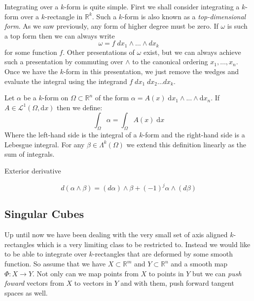 Integrating over a $k$-form is quite simple.
First we shall consider integrating a $k$-form over a $k$-rectangle in $\mathbb{R}^k$.
Such a $k$-form is also known as a \emph{top-dimensional form}.
As we saw previously, any form of higher degree must be zero.
If $\omega$ is such a top form then we can always write
\begin{equation}
	\omega = f \; dx_1 \wedge \ldots \wedge dx_k
\end{equation}
for some function $f$.
Other presentations of $\omega$ exist, but we can always achieve such a presentation by commuting over $\wedge$ 
to the canonical ordering $x_1, \ldots, x_n$.
Once we have the $k$-form in this presentation, we just remove the wedges and evaluate the integral using the
integrand $f \; dx_1 \;dx_2 \ldots dx_k$.

\begin{definition}
Let $\alpha$ be a $k$-form on $\Omega \subset \mathbb{R}^n$ of the form $\alpha = A(x) \; \text{d}x_1 \wedge ... \wedge \text{d} x_n$.
If $A \in \mathcal{L}^1 (\Omega , \text{d}x)$ then we define:
\begin{equation}
\int_\Omega \alpha = \int_\Omega A(x) \; \text{d}x
\end{equation}
Where the left-hand side is the integral of a $k$-form and the right-hand side is a Lebesgue integral.
For any $\beta \in \Lambda^k (\Omega)$ we extend this definition linearly as the sum of integrals.
\end{definition}

\begin{definition}
Exterior derivative
\end{definition}


\begin{equation}
d(\alpha \wedge \beta) = (d \alpha) \wedge \beta + (-1)^j \alpha \wedge ( d \beta)
\end{equation}


\subsection{Singular Cubes}

Up until now we have been dealing with the very small set of axis aligned $k$-rectangles 
which is a very limiting class to be restricted to.
Instead we would like to be able to integrate over $k$-rectangles that are deformed by some smooth function.
So assume that we have $X \subset \mathbb{R}^m$ and $Y \subset \mathbb{R}^n$ and a smooth map 
 $\varPhi : X \to Y$.
Not only can we map points from $X$ to points in $Y$ but we can \emph{push foward} vectors from $X$ to vectors in $Y$
and with them, push forward tangent spaces as well.


